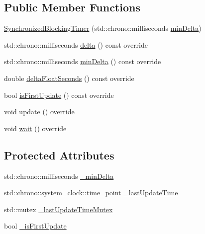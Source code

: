 \subsection*{Public Member Functions}
\begin{DoxyCompactItemize}
\item 
\hyperlink{class_synchronized_blocking_timer_a574e962e33397f3ad630f071ebe1b00d}{Synchronized\-Blocking\-Timer} (std\-::chrono\-::milliseconds \hyperlink{class_synchronized_blocking_timer_a42156631ff9193cdfffb60b10c40da05}{min\-Delta})
\item 
std\-::chrono\-::milliseconds \hyperlink{class_synchronized_blocking_timer_a41956960b15f14341f6018e2f5377f4b}{delta} () const override
\item 
std\-::chrono\-::milliseconds \hyperlink{class_synchronized_blocking_timer_a42156631ff9193cdfffb60b10c40da05}{min\-Delta} () const override
\item 
double \hyperlink{class_synchronized_blocking_timer_a0a6306ec32b43c92965b5597c60d51fa}{delta\-Float\-Seconds} () const override
\item 
bool \hyperlink{class_synchronized_blocking_timer_aac722c8e143693caf08eed7cce5c3664}{is\-First\-Update} () const override
\item 
void \hyperlink{class_synchronized_blocking_timer_aa6e10fdb7eafa40d99f65756bd0d2e63}{update} () override
\item 
void \hyperlink{class_synchronized_blocking_timer_aa4db03f54196073f9f457052d565d2ff}{wait} () override
\end{DoxyCompactItemize}
\subsection*{Protected Attributes}
\begin{DoxyCompactItemize}
\item 
std\-::chrono\-::milliseconds \hyperlink{class_synchronized_blocking_timer_a61a45cf02dfe6a18392f493459d98790}{\-\_\-min\-Delta}
\item 
std\-::chrono\-::system\-\_\-clock\-::time\-\_\-point \hyperlink{class_synchronized_blocking_timer_af62f107591c594d9dd0d02ae1704e837}{\-\_\-last\-Update\-Time}
\item 
std\-::mutex \hyperlink{class_synchronized_blocking_timer_a58be1f30a605ac30c54590965bbe5ddb}{\-\_\-last\-Update\-Time\-Mutex}
\item 
bool \hyperlink{class_synchronized_blocking_timer_aaeae47504e92a69acc21d715f003ceeb}{\-\_\-is\-First\-Update}
\end{DoxyCompactItemize}


